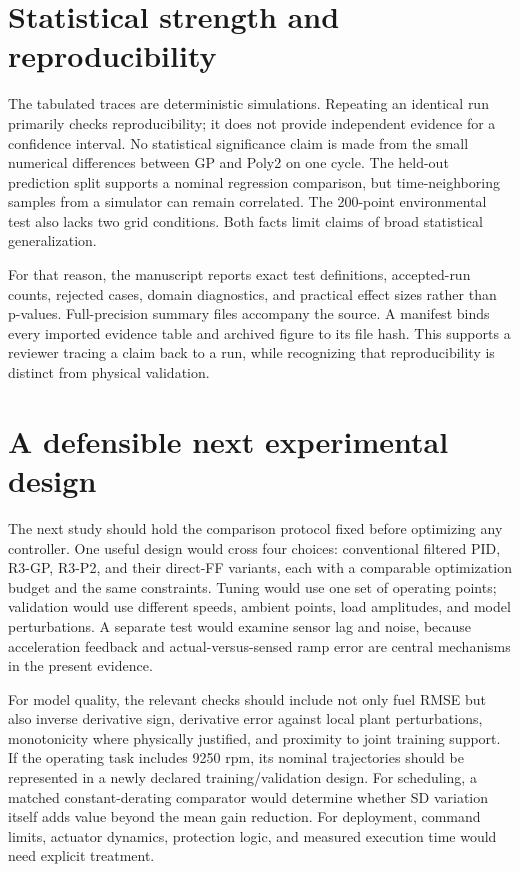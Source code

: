 \documentclass[11pt,a4paper,oneside]{report}
\begin{document}
\section{Statistical strength and reproducibility}
The tabulated traces are deterministic simulations. Repeating an identical run primarily checks reproducibility; it does not provide independent evidence for a confidence interval. No statistical significance claim is made from the small numerical differences between GP and Poly2 on one cycle. The held-out prediction split supports a nominal regression comparison, but time-neighboring samples from a simulator can remain correlated. The 200-point environmental test also lacks two grid conditions. Both facts limit claims of broad statistical generalization.

For that reason, the manuscript reports exact test definitions, accepted-run counts, rejected cases, domain diagnostics, and practical effect sizes rather than p-values. Full-precision summary files accompany the source. A manifest binds every imported evidence table and archived figure to its file hash. This supports a reviewer tracing a claim back to a run, while recognizing that reproducibility is distinct from physical validation.

\section{A defensible next experimental design}
The next study should hold the comparison protocol fixed before optimizing any controller. One useful design would cross four choices: conventional filtered PID, R3-GP, R3-P2, and their direct-FF variants, each with a comparable optimization budget and the same constraints. Tuning would use one set of operating points; validation would use different speeds, ambient points, load amplitudes, and model perturbations. A separate test would examine sensor lag and noise, because acceleration feedback and actual-versus-sensed ramp error are central mechanisms in the present evidence.

For model quality, the relevant checks should include not only fuel RMSE but also inverse derivative sign, derivative error against local plant perturbations, monotonicity where physically justified, and proximity to joint training support. If the operating task includes 9250 rpm, its nominal trajectories should be represented in a newly declared training/validation design. For scheduling, a matched constant-derating comparator would determine whether SD variation itself adds value beyond the mean gain reduction. For deployment, command limits, actuator dynamics, protection logic, and measured execution time would need explicit treatment.
\end{document}

